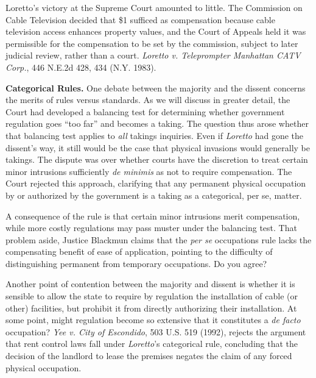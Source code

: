 
\item {}

\item Loretto's victory at the Supreme Court amounted to little. The Commission
on Cable Television decided that \$1 sufficed as compensation because cable
television access enhances property values, and the Court of Appeals held it was
permissible for the compensation to be set by the commission, subject to later
judicial review, rather than a court. \emph{Loretto v. Teleprompter Manhattan
CATV Corp.}, 446 N.E.2d 428, 434 (N.Y. 1983).

\item \textbf{Categorical Rules.} One debate between the majority and the
dissent concerns the merits of rules versus standards. As we will discuss in
greater detail, the Court had developed a balancing test for determining whether
government regulation goes ``too far'' and becomes a taking. The question thus
arose whether that balancing test applies to \textit{all} takings inquiries.
Even if \textit{Loretto} had gone the dissent's way, it still would be the case
that physical invasions would generally be takings. The dispute was over whether
courts have the discretion to treat certain minor intrusions sufficiently
\textit{de minimis} as not to require compensation. The Court rejected this
approach, clarifying that any permanent physical occupation by or authorized by
the government is a taking as a categorical, per se, matter. 

\item A consequence of the rule is that certain minor intrusions merit
compensation, while more costly regulations may pass muster under the balancing
test. That problem aside, Justice Blackmun claims that the \textit{per se}
occupations rule lacks the compensating benefit of ease of application, pointing
to the difficulty of distinguishing permanent from temporary occupations. Do you
agree?

\item Another point of contention between the majority and dissent is whether it
is sensible to allow the state to require by regulation the installation of
cable (or other) facilities, but prohibit it from directly authorizing their
installation. At some point, might regulation become so extensive that it
constitutes a \textit{de facto} occupation? \textit{Yee v. City of Escondido},
503 U.S. 519 (1992), rejects the argument that rent control laws fall under
\textit{Loretto}'s categorical rule, concluding that the decision of the
landlord to lease the premises negates the claim of any forced physical
occupation. 

